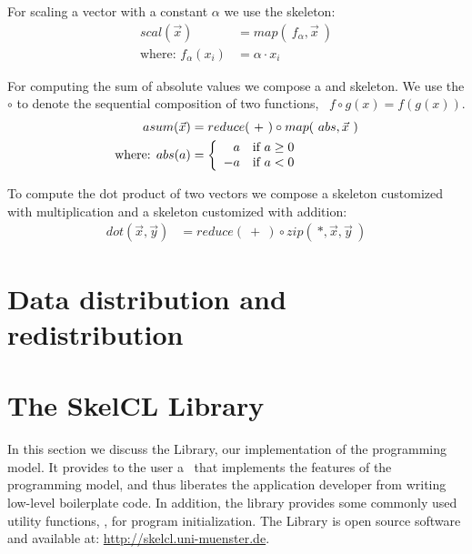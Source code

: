 For scaling a vector with a constant $\alpha$ we use the \map skeleton:
\begin{align*}
  scal(\vec{x}) &= map(\ f_{\alpha}, \vec{x}\ )\\
  \text{where: } f_{\alpha}(x_i) &= \alpha \cdot x_i
\end{align*}

\noindent
For computing the sum of absolute values we compose a \map and \reduce skeleton.
We use the $\circ$ to denote the sequential composition of two functions, \ie\ $f \circ g(x) = f(g(x))$.
\begin{align*}
  asum(\vec{x}) &= reduce(\ +\ ) \circ map(\ abs, \vec{x}\ )\\
  \text{where: } abs(a) &=
    \left\{
      \begin{array}{r l}
      a & \text{if } a \geq 0\\
      -a & \text{if } a < 0
      \end{array}
    \right.
\end{align*}

\noindent
To compute the dot product of two vectors we compose a \zip skeleton customized with multiplication and a \reduce skeleton customized with addition:
\begin{align*}
  dot(\vec{x}, \vec{y}) &= reduce(\ +\ ) \circ zip(\ *, \vec{x}, \vec{y}\ )
\end{align*}

\section{Data distribution and redistribution}










\section{The SkelCL Library}
\label{section:skelcl-library}
In this section we discuss the \SkelCL Library, our implementation of the \SkelCL programming model.
It provides to the user a \Cpp~\API that implements the features of the \SkelCL programming model, and thus liberates the application developer from writing low-level boilerplate code.
In addition, the library provides some commonly used utility functions, \eg, for program initialization.
The \SkelCL Library is open source software and available at: \url{http://skelcl.uni-muenster.de}.

